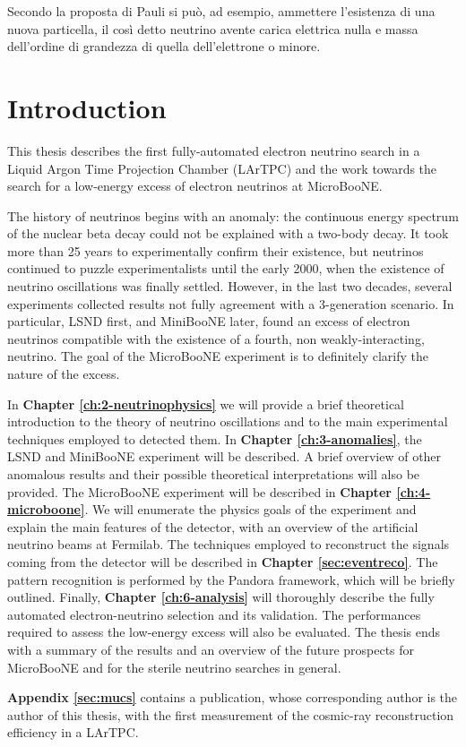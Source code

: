 \begin{savequote}[8cm]
 Secondo la proposta di Pauli si può, ad esempio, ammettere l'esistenza di una nuova particella, il così detto neutrino avente carica elettrica nulla e massa dell'ordine di grandezza di quella dell'elettrone o minore.
\end{savequote}

\chapter{\label{ch:1-intro}Introduction} 

This thesis describes the first fully-automated electron neutrino search in a Liquid Argon Time Projection Chamber (LArTPC) and the work towards the search for a low-energy excess of electron neutrinos at MicroBooNE.

The history of neutrinos begins with an anomaly: the continuous energy spectrum of the nuclear beta decay could not be explained with a two-body decay. It took more than 25 years to experimentally confirm their existence, but neutrinos continued to puzzle experimentalists until the early 2000, when the existence of neutrino oscillations was finally settled. 
However, in the last two decades, several experiments collected results not fully agreement with a 3-generation scenario.
In particular, LSND first, and MiniBooNE later, found an excess of electron neutrinos compatible with the existence of a fourth, non weakly-interacting, neutrino. The goal of the MicroBooNE experiment is to definitely clarify the nature of the excess.

In \textbf{Chapter \ref{ch:2-neutrinophysics}} we will provide a brief theoretical introduction to the theory of neutrino oscillations and to the main experimental techniques employed to detected them.
In \textbf{Chapter \ref{ch:3-anomalies}}, the LSND and MiniBooNE experiment will be described. A brief overview of other anomalous results and their possible theoretical interpretations will also be provided.
The MicroBooNE experiment will be described in \textbf{Chapter \ref{ch:4-microboone}}. We will enumerate the physics goals of the experiment and explain the main features of the detector, with an overview of the artificial neutrino beams at Fermilab.
The techniques employed to reconstruct the signals coming from the detector will be described in \textbf{Chapter \ref{sec:eventreco}}. The pattern recognition is performed by the Pandora framework, which will be briefly outlined.
Finally, \textbf{Chapter \ref{ch:6-analysis}} will thoroughly describe the fully automated electron-neutrino selection and its validation. The performances required to assess the low-energy excess will also be evaluated.
The thesis ends with a summary of the results and an overview of the future prospects for MicroBooNE and for the sterile neutrino searches in general. 

\vspace{1em}

\textbf{Appendix \ref{sec:mucs}} contains a publication, whose corresponding author is the author of this thesis, with the first measurement of the cosmic-ray reconstruction efficiency in a LArTPC.